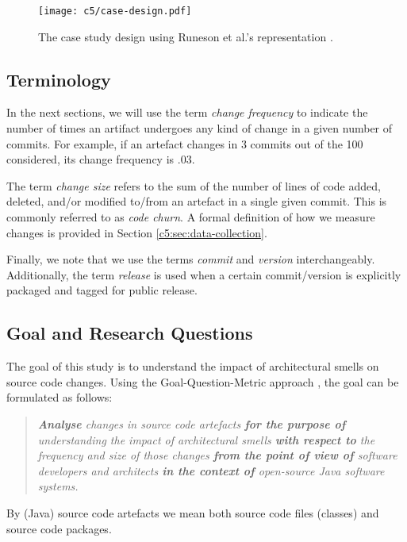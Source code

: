 \begin{figure}
    \centering
    \texttt{[image: c5/case-design.pdf]}
    \caption{The case study design using Runeson et al.'s representation \cite{Runeson2012}.}
    \label{c5:fig:case-design}
\end{figure}

\subsection{Terminology}
In the next sections, we will use the term \emph{change frequency} to indicate the number of times an artifact undergoes any kind of change in a given number of commits.
For example, if an artefact changes in 3 commits out of the 100 considered, its change frequency is $.03$.

The term \emph{change size} refers to the sum of the number of lines of code added, deleted, and/or modified to/from an artefact in a single given commit.
This is commonly referred to as \emph{code churn}.
A formal definition of how we measure changes is provided in Section \ref{c5:sec:data-collection}.

Finally, we note that we use the terms \emph{commit} and \emph{version} interchangeably. Additionally, the term \emph{release} is used when a certain commit/version is explicitly packaged and tagged for public release.

\subsection{Goal and Research Questions}
The goal of this study is to understand the impact of architectural smells on source code changes.
Using the Goal-Question-Metric approach \cite{VanSolingen2002}, the goal can be formulated as follows: 
\begin{quote}
    \itshape
    \textbf{Analyse} changes in source code artefacts \textbf{for the purpose of} understanding the impact of architectural smells \textbf{with respect to} the frequency and size of those changes \textbf{from the point of view of} software developers and architects \textbf{in the context of} open-source Java software systems.
\end{quote}
By (Java) source code artefacts we mean both source code files (classes) and source code packages.

